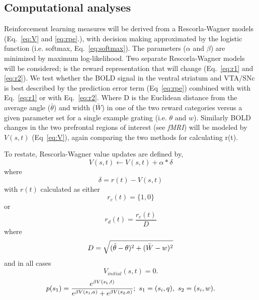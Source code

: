 \documentclass[doc,12pt]{apa}        %
\begin{document}
\subsection{Computational analyses} %
\label{sub:Computational}
Reinforcement learning measures will be derived from a Rescorla-Wagner models (Eq.~\ref{eq:V} and \ref{eq:rpe}.), with decision making approximated by the logistic function (i.e. softmax, Eq.~\ref{eq:softmax}).  The parameters ($\alpha$ and $\beta$) are minimized by maximum log-likelihood.  Two separate Rescorla-Wagner models will be considered; is the reward representation that will change (Eq.~\ref{eq:r1} and \ref{eq:r2}).    We test whether the BOLD signal in the ventral striatum and VTA/SNc is best described by the prediction error term (Eq~\ref{eq:rpe}) combined with with Eq.~\ref{eq:r1} or with Eq.~\ref{eq:r2}.  Where D is the Euclidean distance from the average angle ($\bar{\theta}$) and width ($\bar{W}$) in one of the two reward categories versus a given parameter set for a single example grating (i.e. $\theta$ and $w$).  Similarly BOLD changes in the two prefrontal regions of interest (see \emph{fMRI}) will be modeled by $V(s,t)$ (Eq~\ref{eq:V}), again comparing the two methods for calculating r(t).

To restate, Rescorla-Wagner value updates are defined by,
\begin{equation} \label{eq:V} V(s,t) \leftarrow V(s,t) + \alpha*\delta \end{equation} where 
\begin{equation} \label{eq:rpe} \delta = r(t) - V(s,t) \end{equation}
with $r(t)$ calculated as either
\begin{equation}
	\label{eq:r1}
	r_{c}(t) = \{1,0\}
\end{equation}
or
\begin{equation}
	\label{eq:r2}
    r_{d}(t) = \frac{r_{c}(t)}{D}
\end{equation}
where
\begin{equation}
	\label{eq:D}\\
	D = \sqrt{(\bar{\theta} - \theta)^2 + (\bar{W}-w)^2}
\end{equation}
and in all cases
\begin{equation} \label{eq:V0} V_{initial}(s,t) = 0. \end{equation}
\begin{equation}
	\label{eq:softmax}
	p(s_1) = {e^{\beta V(s_1,t)}\over{e^{\beta V(s_1,a)} + e^{\beta V(s_2,a)}}};\ s_1 = (s_{i},q), \ s_2 = (s_{i}, w).
\end{equation}
\end{document}
